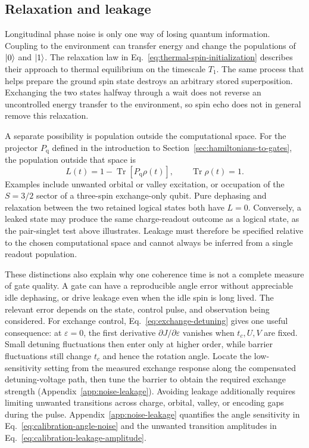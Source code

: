 \subsection{Relaxation and leakage}

Longitudinal phase noise is only one way of losing quantum
information. Coupling to the environment can transfer energy and
change the populations of $\lvert 0\rangle$ and $\lvert 1\rangle$. The relaxation law
in Eq.~\eqref{eq:thermal-spin-initialization} describes their
approach to thermal equilibrium on the timescale $T_1$. The same
process that helps prepare the ground spin state destroys an
arbitrary stored superposition. Exchanging the two states halfway
through a wait does not reverse an uncontrolled energy transfer
to the environment, so spin echo does not in general remove this
relaxation.

A separate possibility is population outside the computational
space. For the projector $P_{\mathrm q}$ defined in the introduction
to Section~\ref{sec:hamiltonians-to-gates}, the population outside
that space is
\begin{equation}
 L(t)=1-\operatorname{Tr}[P_{\mathrm q}\rho(t)],
 \qquad \operatorname{Tr}\rho(t)=1.
 \label{eq:platform-leakage-population}
\end{equation}
Examples include unwanted orbital or valley excitation, or
occupation of the $S=3/2$ sector of a three-spin exchange-only
qubit. Pure dephasing and relaxation between the two retained
logical states both have $L=0$. Conversely, a leaked state may
produce the same charge-readout outcome as a logical state, as the
pair-singlet test above illustrates. Leakage must therefore be
specified relative to the chosen computational space and cannot
always be inferred from a single readout population.

These distinctions also explain why one coherence time is not a
complete measure of gate quality. A gate can have a reproducible
angle error without appreciable idle dephasing, or drive leakage
even when the idle spin is long lived. The relevant error depends
on the state, control pulse, and observation being considered.
For exchange control, Eq.~\eqref{eq:exchange-detuning} gives one
useful consequence: at $\varepsilon=0$, the first derivative
$\partial J/\partial\varepsilon$ vanishes when $t_c,U,V$ are fixed.
Small detuning fluctuations then enter only at higher order, while
barrier fluctuations still change $t_c$ and hence the rotation angle.
Locate the low-sensitivity setting from the measured exchange
response along the compensated detuning-voltage path, then tune
the barrier to obtain the required exchange strength
(Appendix~\ref{app:noise-leakage}).
Avoiding leakage additionally requires limiting unwanted transitions
across charge, orbital, valley, or encoding gaps during the pulse.
Appendix~\ref{app:noise-leakage} quantifies the angle sensitivity in
Eq.~\eqref{eq:calibration-angle-noise} and the unwanted transition
amplitudes in Eq.~\eqref{eq:calibration-leakage-amplitude}.

